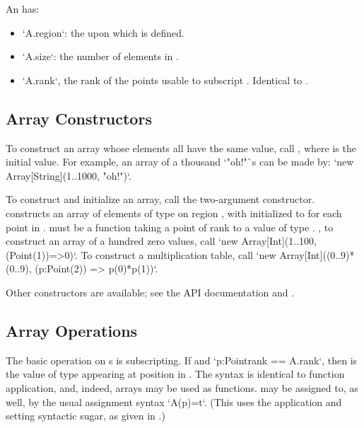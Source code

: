 An   has: 
\begin{itemize}
\item \xcd`A.region`: the  upon which  is defined.
\item \xcd`A.size`: the number of elements in .
\item \xcd`A.rank`, the rank of the points usable to subscript .
      Identical to .
\end{itemize}

\subsection{Array Constructors}

To construct an array whose elements all have the same value, call
, where  is the initial value. 
For example, an array of a thousand \xcd`"oh!"`s can be made by:
\xcd`new Array[String](1..1000, "oh!")`.

To construct and initialize an array, call the two-argument constructor. 
 constructs an array of elements of type  on
region , with  initialized to  for each point
 in .   must be a function taking a point of rank
 to a value of type .  \Eg, to construct an array of a
hundred zero values, call
\xcd`new Array[Int](1..100, (Point(1))=>0)`. 
To construct a multiplication table, call
\xcd`new Array[Int]((0..9)*(0..9), (p:Point(2)) => p(0)*p(1))`.

Other constructors are available; see the API documentation and
. 

\subsection{Array Operations}

The basic operation on s is subscripting.  If  and 
\xcd`p:Point{rank == A.rank}`, then  is the value of type 
appearing at position  in .    The syntax is identical to
function application, and, indeed, arrays may be used as functions.
 may be assigned to, as well, by the usual assignment syntax
\xcd`A(p)=t`.
(This uses the application and setting syntactic sugar, as given in .)

